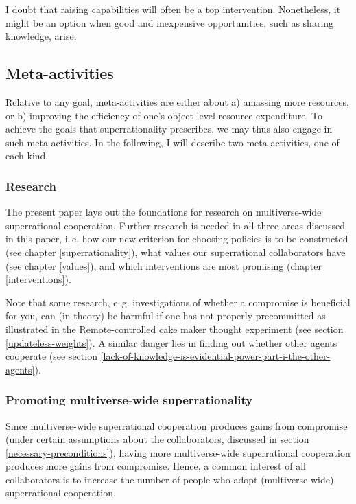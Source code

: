 I doubt that raising capabilities will often be a top intervention.
Nonetheless, it might be an option when good and inexpensive
opportunities, such as sharing knowledge, arise.

\hypertarget{meta-activities}{\subsection{Meta-activities}\label{meta-activities}}

Relative to any goal, meta-activities are either about a) amassing more
resources, or b) improving the efficiency of one's object-level resource
expenditure. To achieve the goals that superrationality prescribes, we
may thus also engage in such meta-activities. In the following, I will
describe two meta-activities, one of each kind.

\subsubsection{Research}\label{research}

The present paper lays out the foundations for research
on multiverse-wide superrational cooperation. Further research
is needed in all three areas discussed in this paper, i.\,e. how our new
criterion for choosing policies is to be constructed (see chapter
\ref{superrationality}), what
values our superrational collaborators have (see chapter
\ref{values}), and which interventions
are most promising (chapter
\ref{interventions}).

Note that some research, e.\,g. investigations of whether a compromise is
beneficial for you, can (in theory) be harmful if one has not properly
precommitted as illustrated in the Remote-controlled cake maker thought
experiment (see section
\ref{updateless-weights}).
A similar danger lies in finding out whether other agents cooperate (see
section
\ref{lack-of-knowledge-is-evidential-power-part-i-the-other-agents}).

\subsubsection{Promoting multiverse-wide superrationality}
\label{promoting-multiverse-wide-superrationality}


Since multiverse-wide superrational cooperation produces gains from
compromise (under certain assumptions about the collaborators, discussed
in section \ref{necessary-preconditions}), having more multiverse-wide superrational
cooperation produces more gains from compromise. Hence, a common
interest of all collaborators is to increase the number of people who
adopt (multiverse-wide) superrational cooperation.


